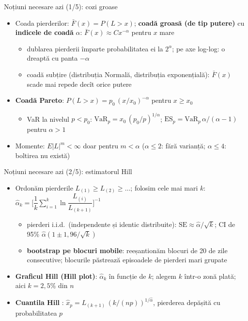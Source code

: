 \begin{frame}{Noțiuni necesare azi (1/5): cozi groase}
\itemsize{\small}
\begin{itemize}
    \item Coada pierderilor: $\bar F(x) = P(L > x)$; \textbf{coadă groasă (de tip putere)} cu \textbf{indicele de coadă} $\alpha$: $\bar F(x) \approx C x^{-\alpha}$ pentru $x$ mare
    \begin{itemize}
        \item dublarea pierderii împarte probabilitatea ei la $2^\alpha$; pe axe log-log: o dreaptă cu panta $-\alpha$
        \item coadă subțire (distribuția Normală, distribuția exponențială): $\bar F(x)$ scade mai repede decît orice putere
    \end{itemize}
    \item \textbf{Coadă Pareto}: $P(L > x) = p_0\,(x/x_0)^{-\alpha}$ pentru $x \ge x_0$
    \begin{itemize}
        \item VaR la nivelul $p < p_0$: $\mathrm{VaR}_p = x_0\,(p_0/p)^{1/\alpha}$; $\mathrm{ES}_p = \mathrm{VaR}_p\,\alpha/(\alpha - 1)$ pentru $\alpha > 1$
    \end{itemize}
    \item Momente: $E|L|^m < \infty$ doar pentru $m < \alpha$ ($\alpha \le 2$: fără varianță; $\alpha \le 4$: boltirea nu există)
\end{itemize}
\end{frame}

\begin{frame}{Noțiuni necesare azi (2/5): estimatorul Hill}
\itemsize{\small}
\begin{itemize}
    \item Ordonăm pierderile $L_{(1)} \ge L_{(2)} \ge \dots$; folosim cele mai mari $k$: $\hat\alpha_k = \Big[\dfrac1k\sum_{i=1}^{k}\ln\dfrac{L_{(i)}}{L_{(k+1)}}\Big]^{-1}$ 
    \begin{itemize}
        \item pierderi i.i.d.\ (independente și identic distribuite): $\mathrm{SE} \approx \hat\alpha/\sqrt{k}$; CI de 95\% $\hat\alpha(1 \pm 1{,}96/\sqrt{k})$
        \item \textbf{bootstrap pe blocuri mobile}: reeșantionăm blocuri de 20 de zile consecutive; blocurile păstrează episoadele de pierderi mari grupate
    \end{itemize}
    \item \textbf{Graficul Hill (Hill plot)}: $\hat\alpha_k$ în funcție de $k$; alegem $k$ într-o zonă plată; aici $k = 2{,}5\%$ din $n$
    \item \textbf{Cuantila Hill} : $\hat x_p = L_{(k+1)}\,(k/(np))^{1/\hat\alpha}$, pierderea depășită cu probabilitatea $p$
\end{itemize}
\end{frame}

